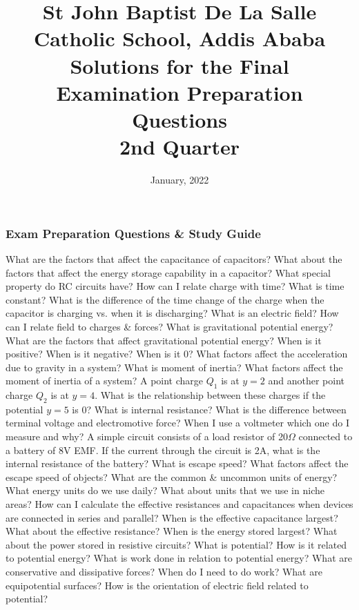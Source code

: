 \documentclass[13pt,addpoints]{exam}
\date{January, 2022}\usepackage{geometry}
\begin{document}
	\title{St John Baptist De La Salle Catholic School, Addis Ababa\\
		\large Solutions for the Final Examination Preparation Questions\\
		2nd Quarter}
	\maketitle
	\subsubsection*{Exam Preparation Questions \& Study Guide}
	\begin{questions}
		\question What are the factors that affect the capacitance of capacitors? What about the factors that affect the energy storage capability in a capacitor? 
		\question What special property do RC circuits have? How can I relate charge with time? What is time constant? What is the difference of the time change of the charge when the capacitor is charging vs. when it is discharging?
		\question What is an electric field? How can I relate field to charges \& forces?
		\question What is gravitational potential energy? What are the factors that affect gravitational potential energy? When is it positive? When is it negative? When is it 0? What factors affect the acceleration due to gravity in a system?
		\question What is moment of inertia? What factors affect the moment of inertia of a system?
		\question A point charge $Q_1$ is at $y=2$ and another point charge $Q_2$ is at $y=4$. What is the relationship between these charges if the potential $y=5$ is 0?
		\question What is internal resistance? What is the difference between terminal voltage and electromotive force? When I use a voltmeter which one do I measure and why?
		\question A simple circuit consists of a load resistor of 20$\Omega$ connected to a battery of 8V EMF. If the current through the circuit is 2A, what is the internal resistance of the battery?
		\question What is escape speed? What factors affect the escape speed of objects?
		\question What are the common \& uncommon units of energy? What energy units do we use daily? What about units that we use in niche areas?
		\question How can I calculate the effective resistances and capacitances when devices are connected in series and parallel? When is the effective capacitance largest? What about the effective resistance? When is the energy stored largest? What about the power stored in resistive circuits?
		\question What is potential? How is it related to potential energy? What is work done in relation to potential energy? What are conservative and dissipative forces? When do I need to do work? What are equipotential surfaces? How is the orientation of electric field related to potential?

\end{questions}
\end{document}
